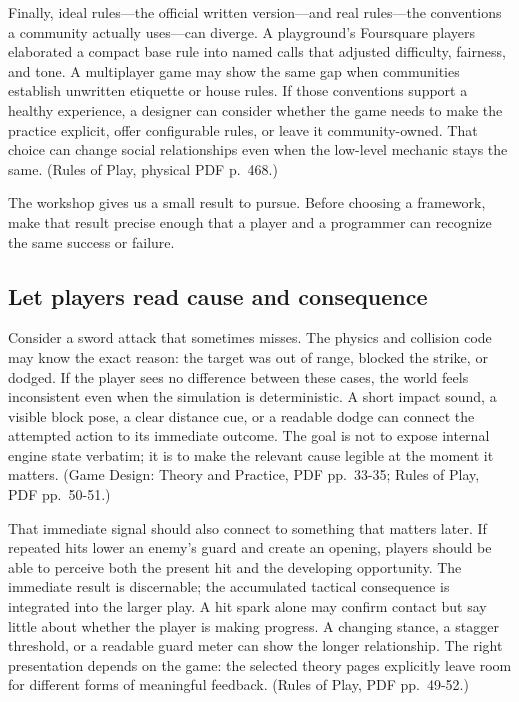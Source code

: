 Finally, ideal rules---the official written version---and real rules---the conventions a community actually uses---can diverge. A playground's Foursquare players elaborated a compact base rule into named calls that adjusted difficulty, fairness, and tone. A multiplayer game may show the same gap when communities establish unwritten etiquette or house rules. If those conventions support a healthy experience, a designer can consider whether the game needs to make the practice explicit, offer configurable rules, or leave it community-owned. That choice can change social relationships even when the low-level mechanic stays the same. (Rules of Play, physical PDF p.~468.)

The workshop gives us a small result to pursue. Before choosing a framework, make that result precise enough that a player and a programmer can recognize the same success or failure.

\subsection{Let players read cause and consequence}\label{05-engine-i-ch009-let-players-read-cause-and-consequence}

\hypertarget{05-engine-i-ch009-let-players-read-cause-and-consequence}{}

Consider a sword attack that sometimes misses. The physics and collision code may know the exact reason: the target was out of range, blocked the strike, or dodged. If the player sees no difference between these cases, the world feels inconsistent even when the simulation is deterministic. A short impact sound, a visible block pose, a clear distance cue, or a readable dodge can connect the attempted action to its immediate outcome. The goal is not to expose internal engine state verbatim; it is to make the relevant cause legible at the moment it matters. (Game Design: Theory and Practice, PDF pp.~33-35; Rules of Play, PDF pp.~50-51.)

That immediate signal should also connect to something that matters later. If repeated hits lower an enemy's guard and create an opening, players should be able to perceive both the present hit and the developing opportunity. The immediate result is discernable; the accumulated tactical consequence is integrated into the larger play. A hit spark alone may confirm contact but say little about whether the player is making progress. A changing stance, a stagger threshold, or a readable guard meter can show the longer relationship. The right presentation depends on the game: the selected theory pages explicitly leave room for different forms of meaningful feedback. (Rules of Play, PDF pp.~49-52.)

